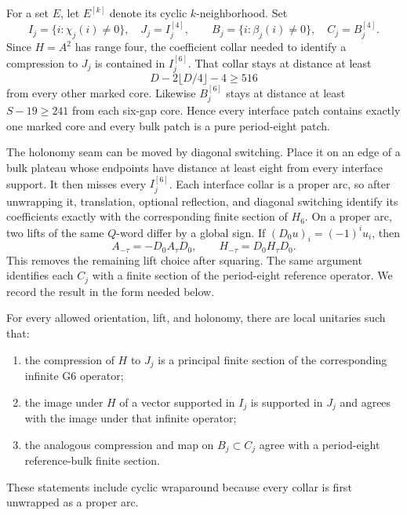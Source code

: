 For a set \(E\), let \(E^{[k]}\) denote its cyclic \(k\)-neighborhood.
Set
\[
 I_j=\{i:\chi_j(i)\neq0\},\quad J_j=I_j^{[4]},\qquad
 B_j=\{i:\beta_j(i)\neq0\},\quad C_j=B_j^{[4]}.
\]
Since \(H=A^2\) has range four, the coefficient collar needed to identify a
compression to \(J_j\) is contained in \(I_j^{[6]}\).  That collar stays at
distance at least
\begin{equation}
 D-2\lfloor D/4\rfloor-4\geq516
 \label{eq:collar-separation}
\end{equation}
from every other marked core.  Likewise \(B_j^{[6]}\) stays at distance at
least \(S-19\geq241\) from each six-gap core.  Hence every interface patch
contains exactly one marked core and every bulk patch is a pure
period-eight patch.

The holonomy seam can be moved by diagonal switching.  Place it on an edge
of a bulk plateau whose endpoints have distance at least eight from every
interface support.  It then misses every \(I_j^{[6]}\).  Each interface
collar is a proper arc, so after unwrapping it, translation, optional
reflection, and diagonal switching identify its coefficients exactly with
the corresponding finite section of \(H_6\).  On a proper arc, two lifts of
the same \(Q\)-word differ by a global sign.  If
\((D_0u)_i=(-1)^iu_i\), then
\begin{equation}
 A_{-\tau}=-D_0A_\tau D_0,\qquad H_{-\tau}=D_0H_\tau D_0.
 \label{eq:lift-equivalence}
\end{equation}
This removes the remaining lift choice after squaring.  The same argument
identifies each \(C_j\) with a finite section of the period-eight reference
operator.  We record the result in the form needed below.

\begin{lemma}
\label{lem:patch-identification}
For every allowed orientation, lift, and holonomy, there are local unitaries
such that:
\begin{enumerate}[label=\textup{(\roman*)}]
\item the compression of \(H\) to \(J_j\) is a principal finite section of
the corresponding infinite G6 operator;
\item the image under \(H\) of a vector supported in \(I_j\) is supported in
\(J_j\) and agrees with the image under that infinite operator;
\item the analogous compression and map on \(B_j\subset C_j\) agree with a
period-eight reference-bulk finite section.
\end{enumerate}
These statements include cyclic wraparound because every collar is first
unwrapped as a proper arc.
\end{lemma}

